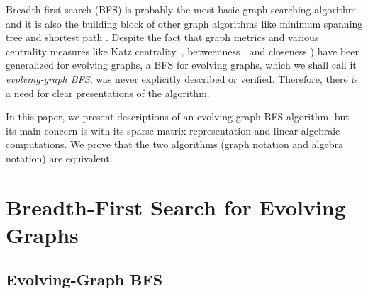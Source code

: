 \documentclass[11pt,conference,compsocconf]{IEEEtran}
\theoremstyle{definition}
\begin{document}
Breadth-first search (BFS) is probably the most basic graph searching algorithm and
it is also the building block of other graph algorithms like minimum spanning tree
and shortest path \cite{ckrs09}.
Despite the fact that graph metrics \cite{ntmm13,tmml09,tsmm09} and
various centrality measures like Katz centrality~\cite{gphe11,grihig13},
betweenness \cite{alhi15}, and closeness \cite{tmml10})
have been generalized for evolving graphs,
a BFS for evolving graphs, which we shall call it \emph{evolving-graph BFS},
was never explicitly described or verified.
Therefore, there is a need for clear presentations of the algorithm. 

In this paper,  we present descriptions of an evolving-graph BFS algorithm, but its main concern is with its sparse matrix
representation and linear algebraic computations.
We prove that the two algorithms (graph notation and algebra notation) are equivalent.



\section{Breadth-First Search for Evolving Graphs}
\label{sec:breadth-first-search}

\subsection{Evolving-Graph BFS}
\label{sec:evolving-graph-bfs}
\end{document}
